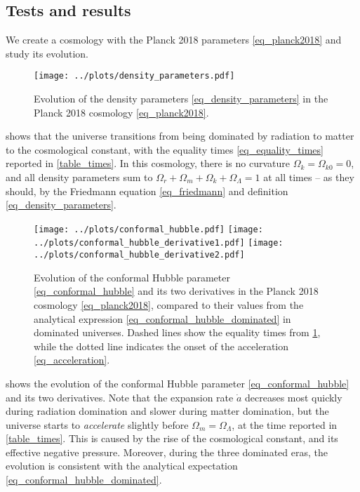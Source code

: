 \documentclass[10pt,a4paper]{article}
\begin{document}
\subsection{Tests and results}

We create a cosmology with the Planck 2018 parameters \eqref{eq_planck2018} and study its evolution.

\begin{figure}[b!]
	\centering
	\texttt{[image: ../plots/density\_parameters.pdf]}
\caption{Evolution of the density parameters \eqref{eq_density_parameters} in the Planck 2018 cosmology \eqref{eq_planck2018}.}
\label{fig_density_parameters}
\end{figure}

 shows that the universe
transitions from being dominated by radiation to matter to the cosmological constant,
with the equality times \eqref{eq_equality_times} reported in \cref{table_times}.
In this cosmology, there is no curvature $\Omega_{k} = \Omega_{k0} = 0$,
and all density parameters sum to $\Omega_{r} + \Omega_m + \Omega_k + \Omega_\Lambda = 1$ at all times -- as they should, by the Friedmann equation \eqref{eq_friedmann} and definition \eqref{eq_density_parameters}.

\begin{figure}
	\centering
	\texttt{[image: ../plots/conformal\_hubble.pdf]}
	\texttt{[image: ../plots/conformal\_hubble\_derivative1.pdf]}
	\texttt{[image: ../plots/conformal\_hubble\_derivative2.pdf]}
	\caption{%
		Evolution of the conformal Hubble parameter \eqref{eq_conformal_hubble} and its two derivatives in the Planck 2018 cosmology \eqref{eq_planck2018},
		compared to their values from the analytical expression \eqref{eq_conformal_hubble_dominated} in dominated universes.
		Dashed lines show the equality times from \cref{fig_density_parameters},
		while the dotted line indicates the onset of the acceleration \eqref{eq_acceleration}.
	}
	\label{fig_conformal_hubble}
\end{figure}

 shows the evolution of the conformal Hubble parameter \eqref{eq_conformal_hubble} and its two derivatives.
Note that the expansion rate $\dot{a}$ decreases most quickly during radiation domination and slower during matter domination,
but the universe starts to \emph{accelerate} slightly before $\Omega_m = \Omega_\Lambda$, at the time reported in \cref{table_times}.
This is caused by the rise of the cosmological constant, and its effective negative pressure.
Moreover, during the three dominated eras,
the evolution is consistent with the analytical expectation \eqref{eq_conformal_hubble_dominated}.
\end{document}
